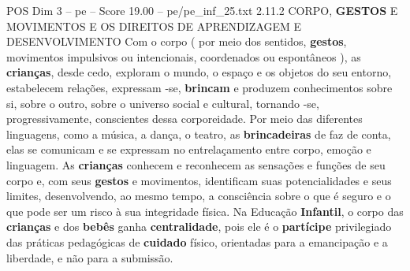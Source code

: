 \begin{textsample}{POS Dim 3 – pe – Score 19.00 – pe/pe\_inf\_25.txt}  \label{ex:f3_pos_273}
2.11.2 CORPO, \textbf{GESTOS} E MOVIMENTOS E OS DIREITOS DE APRENDIZAGEM E DESENVOLVIMENTO Com o corpo ( por meio dos sentidos, \textbf{gestos}, movimentos impulsivos ou intencionais, coordenados ou espontâneos ), as \textbf{crianças}, desde cedo, exploram o mundo, o espaço e os objetos do seu entorno, estabelecem relações, expressam -se, \textbf{brincam} e produzem conhecimentos sobre si, sobre o outro, sobre o universo social e cultural, tornando -se, progressivamente, conscientes dessa corporeidade.
Por meio das diferentes linguagens, como a música, a dança, o teatro, as \textbf{brincadeiras} de faz de conta, elas se comunicam e se expressam no entrelaçamento entre corpo, emoção e linguagem.
As \textbf{crianças} conhecem e reconhecem as sensações e funções de seu corpo e, com seus \textbf{gestos} e movimentos, identificam suas potencialidades e seus limites, desenvolvendo, ao mesmo tempo, a consciência sobre o que é seguro e o que pode ser um risco à sua integridade física.
Na Educação \textbf{Infantil}, o corpo das \textbf{crianças} e dos \textbf{bebês} ganha \textbf{centralidade}, pois ele é o \textbf{partícipe} privilegiado das práticas pedagógicas de \textbf{cuidado} físico, orientadas para a emancipação e a liberdade, e não para a submissão.

\end{textsample}
